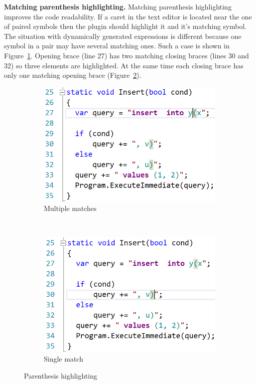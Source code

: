 \textbf{Matching parenthesis highlighting.} Matching parenthesis highlighting improves the code readability. If a caret in the text editor is located near the one of paired symbols then the plugin should highlight it and it's matching symbol. The situation with dynamically generated expressions is different because one symbol in a pair may have several matching ones. Such a case is shown in Figure~\ref{brace1}. Opening brace (line 27) has two matching closing braces (lines 30 and 32) so three elements are highlighted. At the same time each closing brace has only one matching opening brace (Figure~\ref{brace2}).

\begin{figure}[h!]
  \begin{center}
    \begin{subfigure}[t]{0.2\textwidth}    
        \includegraphics[scale=0.3]{Figures/brackets_one_to_many.PNG}    
    \caption{Multiple matches}
    \label{brace1}
    \end{subfigure}
	~\qquad
    \begin{subfigure}[t]{0.2\textwidth}      
            \includegraphics[scale=0.3]{Figures/brackets_one_to_one.PNG}        
        \caption{Single match}
        \label{brace2}
    \end{subfigure}
    \caption{Parenthesis highlighting}
    \label{braces}
  \end{center}
\end{figure}